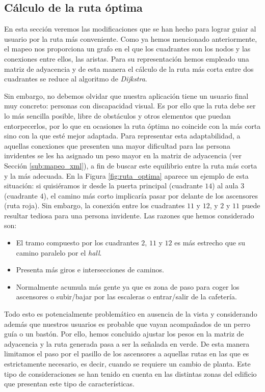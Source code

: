\subsection{Cálculo de la ruta óptima}
\label{sub:rutaOptima}

En esta sección veremos las modificaciones que se han hecho para lograr guiar al usuario por la ruta más conveniente. Como ya hemos mencionado anteriormente, el mapeo nos proporciona un grafo en el que los cuadrantes son los nodos y las conexiones entre ellos, las aristas. Para su representación hemos empleado una matriz de adyacencia y de esta manera el cálculo de la ruta más corta entre dos cuadrantes se reduce al algoritmo de \textit{Dijkstra}.

Sin embargo, no debemos olvidar que nuestra aplicación tiene un usuario final muy concreto: personas con discapacidad visual. Es por ello que la ruta debe ser lo más sencilla posible, libre de obstáculos y otros elementos que puedan entorpecerlos, por lo que en ocasiones la ruta óptima no coincide con la más corta sino con la que esté mejor adaptada. Para representar esta adaptabilidad, a aquellas conexiones que presenten una mayor dificultad para las persona invidentes se les ha asignado un peso mayor en la matriz de adyacencia (ver Sección \ref{sub:mapeo_xml}), a fin de buscar este equilibrio entre la ruta más corta y la más adecuada. En la Figura \ref{fig:ruta_optima} aparece un ejemplo de esta situación: si quisiéramos ir desde la puerta principal (cuadrante $14$) al aula 3 (cuadrante $4$), el camino más corto implicaría pasar por delante de los ascensores (ruta roja). Sin embargo, la conexión entre los cuadrantes $11$ y $12$, y $2$ y $11$ puede resultar tediosa para una persona invidente. Las razones que hemos considerado son: 
\begin{itemize}
	\item El tramo compuesto por los cuadrantes $2$, $11$ y $12$ es más estrecho que su camino paralelo por el \textit{hall}.
	\item Presenta más giros e intersecciones de caminos.
	\item Normalmente acumula más gente ya que es zona de paso para coger los ascensores o subir/bajar por las escaleras o entrar/salir de la cafetería.
\end{itemize} 
 	Todo esto es potencialmente problemático en ausencia de la vista y considerando además que nuestros usuarios es probable que vayan acompañados de un perro guía o un bastón. Por ello, hemos concluido ajustar los pesos en la matriz de adyacencia y la ruta generada pasa a ser la señalada en verde. De esta manera limitamos el paso por el pasillo de los ascensores a aquellas rutas en las que es estrictamente necesario, es decir, cuando se requiere un cambio de planta. Este tipo de consideraciones se han tenido en cuenta en las distintas zonas del edificio que presentan este tipo de características.


